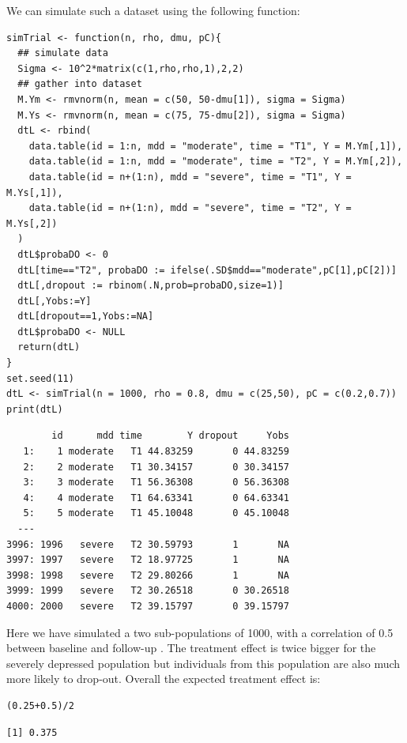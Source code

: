 \documentclass[12pt]{article}
\begin{document}
We can simulate such a dataset using the following function:
\lstset{language=r,label= ,caption= ,captionpos=b,numbers=none}
\begin{lstlisting}
simTrial <- function(n, rho, dmu, pC){
  ## simulate data
  Sigma <- 10^2*matrix(c(1,rho,rho,1),2,2)
  ## gather into dataset
  M.Ym <- rmvnorm(n, mean = c(50, 50-dmu[1]), sigma = Sigma)
  M.Ys <- rmvnorm(n, mean = c(75, 75-dmu[2]), sigma = Sigma)
  dtL <- rbind(
    data.table(id = 1:n, mdd = "moderate", time = "T1", Y = M.Ym[,1]),
    data.table(id = 1:n, mdd = "moderate", time = "T2", Y = M.Ym[,2]),
    data.table(id = n+(1:n), mdd = "severe", time = "T1", Y = M.Ys[,1]),
    data.table(id = n+(1:n), mdd = "severe", time = "T2", Y = M.Ys[,2])
  )
  dtL$probaDO <- 0
  dtL[time=="T2", probaDO := ifelse(.SD$mdd=="moderate",pC[1],pC[2])]
  dtL[,dropout := rbinom(.N,prob=probaDO,size=1)]
  dtL[,Yobs:=Y]
  dtL[dropout==1,Yobs:=NA]
  dtL$probaDO <- NULL
  return(dtL)
}
set.seed(11)
dtL <- simTrial(n = 1000, rho = 0.8, dmu = c(25,50), pC = c(0.2,0.7))
print(dtL)
\end{lstlisting}

\begin{verbatim}
        id      mdd time        Y dropout     Yobs
   1:    1 moderate   T1 44.83259       0 44.83259
   2:    2 moderate   T1 30.34157       0 30.34157
   3:    3 moderate   T1 56.36308       0 56.36308
   4:    4 moderate   T1 64.63341       0 64.63341
   5:    5 moderate   T1 45.10048       0 45.10048
  ---                                             
3996: 1996   severe   T2 30.59793       1       NA
3997: 1997   severe   T2 18.97725       1       NA
3998: 1998   severe   T2 29.80266       1       NA
3999: 1999   severe   T2 30.26518       0 30.26518
4000: 2000   severe   T2 39.15797       0 39.15797
\end{verbatim}

Here we have simulated a two sub-populations of 1000, with a
correlation of 0.5 between baseline and follow-up . The treatment
effect is twice bigger for the severely depressed population but
individuals from this population are also much more likely to
drop-out. Overall the expected treatment effect is:
\lstset{language=r,label= ,caption= ,captionpos=b,numbers=none}
\begin{lstlisting}
(0.25+0.5)/2
\end{lstlisting}

\begin{verbatim}
[1] 0.375
\end{verbatim}
\end{document}
